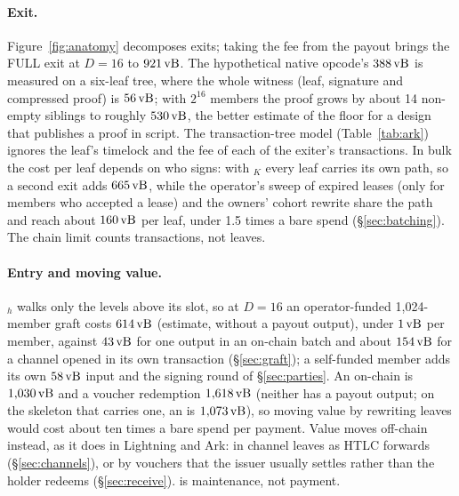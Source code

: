 \paragraph{Exit.} Figure~\ref{fig:anatomy} decomposes exits; taking the
fee from the payout brings the FULL exit at $D = 16$ to $921\,\mathrm{vB}$. The
hypothetical native opcode's $388\,\mathrm{vB}$ is measured on a six-leaf tree,
where the whole witness (leaf, signature and compressed proof) is
$56\,\mathrm{vB}$; with $2^{16}$ members the
proof grows by about 14 non-empty siblings to roughly $530\,\mathrm{vB}$, the
better estimate of the floor for a design that publishes a proof in
script. The transaction-tree model (Table~\ref{tab:ark}) ignores the
leaf's timelock and the fee of each of the exiter's transactions. In
bulk the cost per leaf depends on who signs: with $_K$ every
leaf carries its own path, so a second exit adds $665\,\mathrm{vB}$, while the
operator's sweep of expired leases (only for members who accepted a
lease) and the owners' cohort rewrite share the path and reach about
$160\,\mathrm{vB}$ per leaf, under 1.5 times a bare spend
(\S\ref{sec:batching}). The chain limit counts transactions, not
leaves.

\paragraph{Entry and moving value.} $_h$ walks only the levels
above its slot, so at $D = 16$ an operator-funded 1{,}024-member graft
costs $614\,\mathrm{vB}$ (estimate, without a payout output), under $1\,\mathrm{vB}$ per member, against $43\,\mathrm{vB}$ for
one output in an on-chain batch and about $154\,\mathrm{vB}$ for a channel opened
in its own transaction (\S\ref{sec:graft}); a self-funded member adds
its own $58\,\mathrm{vB}$ input and the signing round of \S\ref{sec:parties}. An
on-chain  is $1{,}030\,\mathrm{vB}$ and a voucher redemption
$1{,}618\,\mathrm{vB}$ (neither has a payout output; on the skeleton that carries
one, an  is $1{,}073\,\mathrm{vB}$), so moving value by rewriting leaves would cost about ten times a bare
spend per payment. Value moves off-chain instead, as it does in
Lightning and Ark: in channel leaves as HTLC forwards
(\S\ref{sec:channels}), or by vouchers that the issuer usually settles
rather than the holder redeems (\S\ref{sec:receive}).  is
maintenance, not payment.





